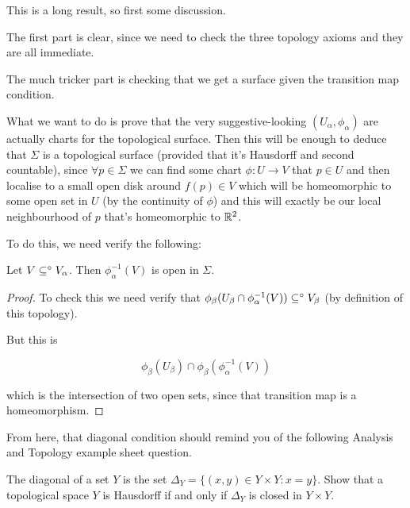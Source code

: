 \documentclass[11pt]{scrartcl}
\begin{document}
This is a long result, so first some discussion.

The first part is clear, since we need to check the three topology axioms and they are all immediate.

The much tricker part is checking that we get a surface given the transition map condition.

What we want to do is prove that the very suggestive-looking $(U_\alpha, \phi_\alpha)$ are actually charts for the topological surface. Then this will be enough to deduce that $\Sigma$ is a topological surface (provided that it's Hausdorff and second countable), since $\forall p \in \Sigma$ we can find some chart $\phi : U \to V$ that $p \in U$ and then localise to a small open disk around $f(p) \in V$ which will be homeomorphic to some open set in $U$ (by the continuity of $\phi$) and this will exactly be our local neighbourhood of $p$ that's homeomorphic to $\mathbb R^2$. 

To do this, we need verify the following:

\begin{lemma}
    Let $V \subseteq^\circ V_\alpha$. Then $\phi_\alpha^{-1}(V)$ is open in $\Sigma$.

    \begin{proof}
        To check this we need verify that $\phi_\beta ( U_\beta \cap  \phi_\alpha^{-1}(V)) \subseteq^\circ V_\beta$ (by definition of this topology).

        But this is

        \begin{equation}
            \phi_\beta (U_\beta) \cap \phi_\beta(\phi_\alpha^{-1}(V))
        \end{equation}

        which is the intersection of two open sets, since that transition map is a homeomorphism.
    \end{proof}
\end{lemma}

From here, that diagonal condition should remind you of the following Analysis and Topology example sheet question.

\begin{example}

The diagonal of a set $Y$ is the set $\Delta_Y = \{(x, y) \in Y \times Y : x = y \}$. Show that a topological space $Y$ is Hausdorff if and only if $\Delta_Y$ is closed in $Y \times Y$.
\end{example}
\end{document}
